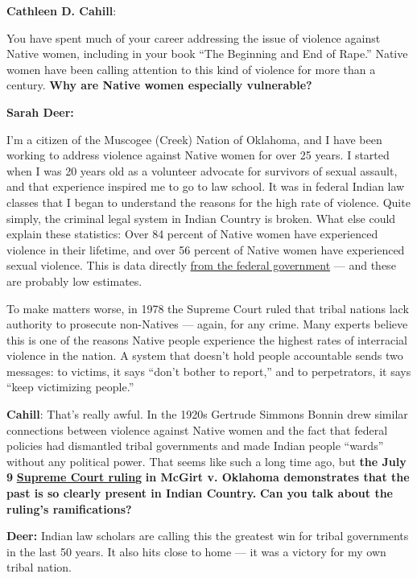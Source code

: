 \textbf{Cathleen D. Cahill}:

You have spent much of your career addressing the issue of violence
against Native women, including in your book ``The Beginning and End of
Rape.'' Native women have been calling attention to this kind of
violence for more than a century. \textbf{Why are Native women
especially vulnerable?}

\textbf{Sarah Deer:}

I'm a citizen of the Muscogee (Creek) Nation of Oklahoma, and I have
been working to address violence against Native women for over 25 years.
I started when I was 20 years old as a volunteer advocate for survivors
of sexual assault, and that experience inspired me to go to law school.
It was in federal Indian law classes that I began to understand the
reasons for the high rate of violence. Quite simply, the criminal legal
system in Indian Country is broken. What else could explain these
statistics: Over 84 percent of Native women have experienced violence in
their lifetime, and over 56 percent of Native women have experienced
sexual violence. This is data directly
\href{https://nij.ojp.gov/topics/articles/violence-against-american-indian-and-alaska-native-women-and-men}{from
the federal government} --- and these are probably low estimates.

To make matters worse, in 1978 the Supreme Court ruled that tribal
nations lack authority to prosecute non-Natives --- again, for any
crime. Many experts believe this is one of the reasons Native people
experience the highest rates of interracial violence in the nation. A
system that doesn't hold people accountable sends two messages: to
victims, it says ``don't bother to report,'' and to perpetrators, it
says ``keep victimizing people.''

\textbf{Cahill}: That's really awful. In the 1920s Gertrude Simmons
Bonnin drew similar connections between violence against Native women
and the fact that federal policies had dismantled tribal governments and
made Indian people ``wards'' without any political power. That seems
like such a long time ago, but \textbf{the July 9}
\textbf{\href{https://www.nytimes.com/2020/07/09/us/supreme-court-oklahoma-mcgirt-creek-nation.html}{Supreme
Court ruling}} \textbf{in McGirt v. Oklahoma demonstrates that the past
is so clearly present in Indian Country.} \textbf{Can you talk about the
ruling's ramifications?}

\textbf{Deer:} Indian law scholars are calling this the greatest win for
tribal governments in the last 50 years. It also hits close to home ---
it was a victory for my own tribal nation.


